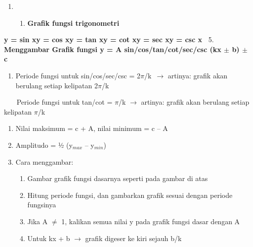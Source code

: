 \documentclass[11pt,fleqn]{book} %
\begin{document}
\begin{myEnumerate}
\begin{itemize}
\noindent 

\noindent 

\noindent 

\noindent 

\noindent 

\noindent 

\noindent 

\noindent 

\noindent 

\begin{enumerate}
\item \begin{enumerate}
\item  \textbf{Grafik fungsi trigonometri}
\end{enumerate}
\end{enumerate}

\noindent \textbf{y = sin xy = cos xy = tan xy = cot xy = sec xy = csc x~} 5. \textbf{Menggambar Grafik fungsi y = A sin/cos/tan/cot/sec/csc (kx $\boldsymbol{\pm}$ b) $\boldsymbol{\pm}$ c}

\begin{enumerate}
\item  Periode fungsi untuk sin/cos/sec/csc = 2$\pi$/k~$\mathrm{\to}$ artinya: grafik akan berulang setiap kelipatan 2$\pi$/k
\end{enumerate}

\noindent ~~~ Periode fungsi untuk tan/cot = $\pi$/k $\mathrm{\to}$ artinya: grafik akan berulang setiap kelipatan $\pi$/k

\begin{enumerate}
\item  Nilai maksimum = c + {\textbar}A{\textbar}, nilai minimum = c -- {\textbar}A{\textbar}

\item  Amplitudo = ½ (y${}_{max}$ -- y${}_{min}$)

\item  Cara menggambar:

\begin{enumerate}
\item  Gambar grafik fungsi dasarnya seperti pada gambar di atas

\item  Hitung periode fungsi, dan gambarkan grafik sesuai dengan periode fungsinya

\item  Jika A $\mathrm{\neq}$ 1, kalikan semua nilai y pada grafik fungsi dasar dengan A

\item  Untuk kx + b $\mathrm{\to}$ grafik digeser ke kiri sejauh b/k
\end{enumerate}
\end{enumerate}


\end{itemize}
\end{myEnumerate}
\end{document}
